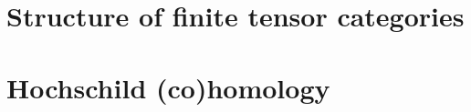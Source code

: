     \begin{appendices}
        \chapter{Structure of finite tensor categories}
            \begin{abstract}
            
            \end{abstract}
            
            \minitoc
        
            
            
            

        \chapter{Hochschild (co)homology}
            \begin{abstract}
            
            \end{abstract}
            
            \minitoc
    \end{appendices}
	
	\printbibliography

